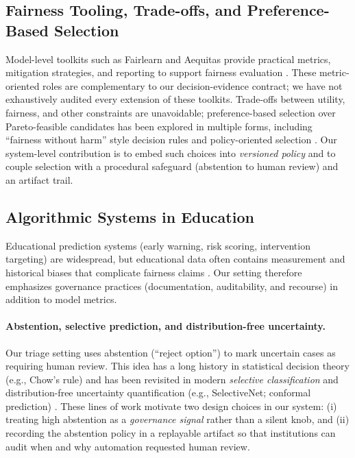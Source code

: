 \subsection{Fairness Tooling, Trade-offs, and Preference-Based Selection}
Model-level toolkits such as Fairlearn and Aequitas provide practical metrics, mitigation strategies, and reporting to support fairness evaluation \cite{Weerts2023Fairlearn,Saleiro2018Aequitas}.
These metric-oriented roles are complementary to our decision-evidence contract; we have not exhaustively audited every extension of these toolkits.
Trade-offs between utility, fairness, and other constraints are unavoidable; preference-based selection over Pareto-feasible candidates has been explored in multiple forms, including ``fairness without harm'' style decision rules and policy-oriented selection \cite{Ustun2019FairnessWithoutHarm}.
Our system-level contribution is to embed such choices into \emph{versioned policy} and to couple selection with a procedural safeguard (abstention to human review) and an artifact trail.

\subsection{Algorithmic Systems in Education}
Educational prediction systems (early warning, risk scoring, intervention targeting) are widespread, but educational data often contains measurement and historical biases that complicate fairness claims \cite{BakerHawn2022AlgorithmicBiasEducation}.
Our setting therefore emphasizes governance practices (documentation, auditability, and recourse) in addition to model metrics.


\paragraph{Abstention, selective prediction, and distribution-free uncertainty.}
Our triage setting uses abstention (``reject option'') to mark uncertain cases as requiring human review. This idea has a long history in statistical decision theory (e.g., Chow's rule) and has been revisited in modern \emph{selective classification} and distribution-free uncertainty quantification (e.g., SelectiveNet; conformal prediction) \cite{Chow1970Reject,Geifman2019SelectiveNet,Angelopoulos2021Conformal}. These lines of work motivate two design choices in our system: (i) treating high abstention as a \emph{governance signal} rather than a silent knob, and (ii) recording the abstention policy in a replayable artifact so that institutions can audit when and why automation requested human review.


